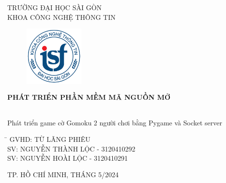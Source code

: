 \documentclass[a4paper]{article}
\begin{document}
\begin{titlepage}
\begin{center}
TRƯỜNG ĐẠI HỌC SÀI GÒN \\
KHOA CÔNG NGHỆ THÔNG TIN
\end{center}
\vspace{1cm}

\begin{figure}[h!]
\begin{center}
\includegraphics[width=3cm]{images/logoITSGUsmall.png}
\end{center}
\end{figure}

\vspace{1cm}


\begin{center}

\vspace{0.3 cm}
{\textbf{{\Large PHÁT TRIỂN PHẦN MỀM MÃ NGUỒN MỞ}}}\\
\vspace{0.3 cm}

~~\\
\Large Phát triển game cờ Gomoku 2 người chơi bằng Pygame và Socket server\\
\end{center}

\vspace{3cm}

\begin{tabbing}
        \hspace{4 cm}\=\kill
        \> GVHD: TỪ LÃNG PHIÊU \\ 
        \> SV: NGUYỄN THÀNH LỘC - 3120410292 \\
        \> SV: NGUYỄN HOÀI LỘC - 3120410291
        
\end{tabbing}

\vspace{3.5 cm}


\begin{center}
{\footnotesize TP. HỒ CHÍ MINH, THÁNG 5/2024}
\end{center}
\end{titlepage}
\end{document}
